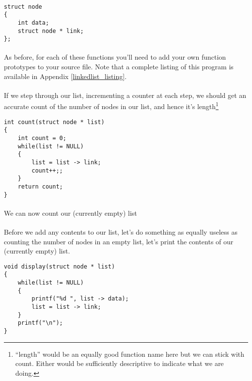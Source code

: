 \documentclass[10pt, a4paper, twosize]{article}
\begin{document}
\paragraph{} 
\begin{lstlisting}
struct node
{
    int data;
    struct node * link;
};
\end{lstlisting}
\paragraph{} 

\paragraph{} As before, for each of these functions you'll need to add your own function prototypes to your source file. Note that a complete listing of this program is available in Appendix \ref{linkedlist_listing}.

\paragraph{} If we step through our list, incrementing a counter at each step, we should get an accurate count of the number of nodes in our list, and hence it's length\footnote{``length'' would be an equally good function name here but we can stick with count. Either would be sufficiently descriptive to indicate what we are doing.}

\begin{lstlisting}
int count(struct node * list)
{
    int count = 0;
    while(list != NULL)
    {
        list = list -> link;
        count++;;
    }
    return count;
}
\end{lstlisting}
\paragraph{} We can now count our (currently empty) list

\paragraph{} Before we add any contents to our list, let's do something as equally useless as counting the number of nodes in an empty list, let's print the contents of our (currently empty) list.
\begin{lstlisting}
void display(struct node * list)
{
    while(list != NULL)
    {
        printf("%d ", list -> data);
        list = list -> link;
    }
    printf("\n");
}
\end{lstlisting}
\end{document}
